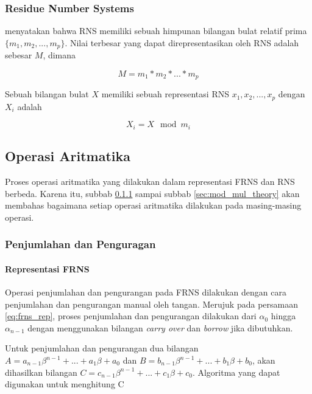 \subsubsection{Residue Number Systems} \label{sec:rns}
\citet{rns_survey} menyatakan bahwa RNS memiliki sebuah himpunan bilangan bulat relatif prima $\{m_1,m_2,...,m_p\}$. Nilai terbesar yang dapat direpresentasikan oleh RNS adalah sebesar $M$, dimana

\begin{equation}
  M = m_1 * m_2 * ... * m_p
\end{equation}

Sebuah bilangan bulat $X$ memiliki sebuah representasi RNS ${x_1,x_2,...,x_p}$ dengan $X_i$ adalah

\begin{equation}
  X_i = X \mod m_i
\end{equation}


\subsection{Operasi Aritmatika}
Proses operasi aritmatika yang dilakukan dalam representasi FRNS dan RNS berbeda. Karena itu, subbab \ref{sec:add_sub_theory} sampai subbab \ref{sec:mod_mul_theory} akan membahas bagaimana setiap operasi aritmatika dilakukan pada masing-masing operasi.

\subsubsection{Penjumlahan dan Penguragan} \label{sec:add_sub_theory}
\paragraph{Representasi FRNS}

Operasi penjumlahan dan pengurangan pada FRNS dilakukan dengan cara penjumlahan dan pengurangan manual oleh tangan. Merujuk pada persamaan \ref{eq:frns_rep}, proses penjumlahan dan pengurangan dilakukan dari $\alpha_0$ hingga $\alpha_{n-1}$ dengan menggunakan bilangan \textit{carry over} dan \textit{borrow} jika dibutuhkan.

Untuk penjumlahan dan pengurangan dua bilangan $A = a_{n-1}\beta^{n-1}+...+a_{1}\beta+a_{0}$ dan $B = b_{n-1}\beta^{n-1}+...+b_{1}\beta+b_{0}$, akan dihasilkan bilangan $C = c_{n-1}\beta^{n-1}+...+c_{1}\beta+c_{0}$. Algoritma yang dapat digunakan untuk menghitung C

